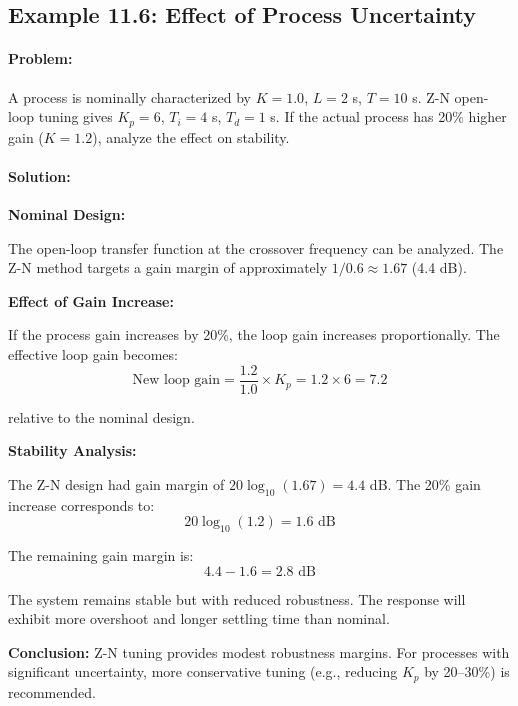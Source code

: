 \hrulefill

\subsection{Example 11.6: Effect of Process Uncertainty}

\paragraph{Problem:} A process is nominally characterized by $K = 1.0$, $L = 2$ s, $T = 10$ s. Z-N open-loop tuning gives $K_p = 6$, $T_i = 4$ s, $T_d = 1$ s. If the actual process has 20\% higher gain ($K = 1.2$), analyze the effect on stability.

\paragraph{Solution:}

\textbf{Nominal Design:}

The open-loop transfer function at the crossover frequency can be analyzed. The Z-N method targets a gain margin of approximately $1/0.6 \approx 1.67$ (4.4 dB).

\textbf{Effect of Gain Increase:}

If the process gain increases by 20\%, the loop gain increases proportionally. The effective loop gain becomes:
\begin{equation}
    \text{New loop gain} = \frac{1.2}{1.0} \times K_p = 1.2 \times 6 = 7.2
\end{equation}

relative to the nominal design.

\textbf{Stability Analysis:}

The Z-N design had gain margin of $20\log_{10}(1.67) = 4.4$ dB. The 20\% gain increase corresponds to:
\begin{equation}
    20\log_{10}(1.2) = 1.6 \text{ dB}
\end{equation}

The remaining gain margin is:
\begin{equation}
    4.4 - 1.6 = 2.8 \text{ dB}
\end{equation}

The system remains stable but with reduced robustness. The response will exhibit more overshoot and longer settling time than nominal.

\textbf{Conclusion:} Z-N tuning provides modest robustness margins. For processes with significant uncertainty, more conservative tuning (e.g., reducing $K_p$ by 20--30\%) is recommended.


